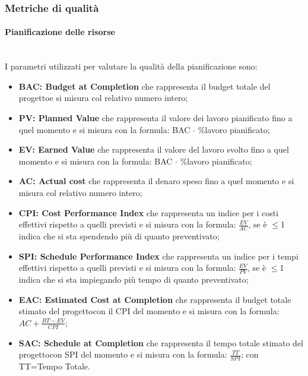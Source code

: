 		\subsubsection{Metriche di qualità}
			\paragraph{Pianificazione delle risorse}\mbox{}\\ [1mm]
			I parametri utilizzati per valutare la qualità della pianificazione sono:
			\begin{itemize}
				\item \textbf{BAC: Budget at Completion} che rappresenta il budget totale del progetto\glosp e si misura col relativo numero intero;
				\item \textbf{PV: Planned Value} che rappresenta il valore dei lavoro pianificato fino a quel momento e si misura con la formula: BAC $\cdot$ \%lavoro pianificato;
				\item \textbf{EV: Earned Value} che rappresenta il valore del lavoro svolto fino a quel momento e si misura con la formula: BAC $\cdot$ \%lavoro pianificato;
				\item \textbf{AC: Actual cost} che rappresenta il denaro speso fino a quel momento e si misura col relativo numero intero;
				\item \textbf{CPI: Cost Performance Index} che rappresenta un indice per i costi effettivi rispetto a quelli previsti e si misura con la formula: $\frac{EV}{AC}$, se è $\le$1 indica che si sta spendendo più di quanto preventivato;
				\item \textbf{SPI: Schedule Performance Index} che rappresenta un indice per i tempi effettivi rispetto a quelli previsti e si misura con la formula: $\frac{EV}{PV}$, se è $\le$1 indica che si sta impiegando più tempo di quanto preventivato;
				\item \textbf{EAC: Estimated Cost at Completion} che rappresenta il budget totale stimato del progetto\glosp con il CPI del momento e si misura con la formula: $AC+\frac{BT-EV}{CPI}$;
				\item \textbf{SAC: Schedule at Completion} che rappresenta il tempo totale stimato del progetto\glosp con SPI del momento e si misura con la formula: $\frac{TT}{SPI}$; con TT=Tempo Totale.
			\end{itemize}	
